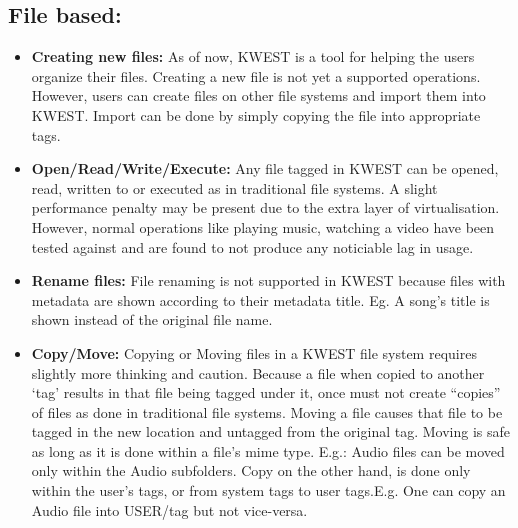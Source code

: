 \subsection{File based:}
\begin{itemize}
\item \textbf{Creating new files:}
As of now, KWEST is a tool for helping the users organize their files. Creating a new file is not yet a supported operations. However, users can create files on other file systems and import them into KWEST. Import can be done by simply copying the file into appropriate tags.
\item \textbf{Open/Read/Write/Execute:}
Any file tagged in KWEST can be opened, read, written to or executed as in traditional file systems. A slight performance penalty may be present due to the extra layer of virtualisation. However, normal operations like playing music, watching a video have been tested against and are found to not produce any noticiable lag in usage.
\item \textbf{Rename files:}
File renaming is not supported in KWEST because files with metadata are shown according to their metadata title. \newline
Eg. A song's title is shown instead of the original file name. 
\item \textbf{Copy/Move:}
Copying or Moving files in a KWEST file system requires slightly more thinking and caution. Because a file when copied to another `tag' results in that file being tagged under it, once must not create ``copies'' of files as done in traditional file systems. Moving a file causes that file to be tagged in the new location and untagged from the original tag. Moving is safe as long as it is done within a file's mime type. \newline
E.g.: Audio files can be moved only within the Audio subfolders. Copy on the other hand, is done only within the user's tags, or from system tags to user tags.E.g. One can copy an Audio file into USER/tag but not vice-versa.
\begin{figure}[htb]
\centering
\setlength\fboxsep{0pt}
\setlength\fboxrule{0.5pt}

\end{figure}
\end{itemize}
